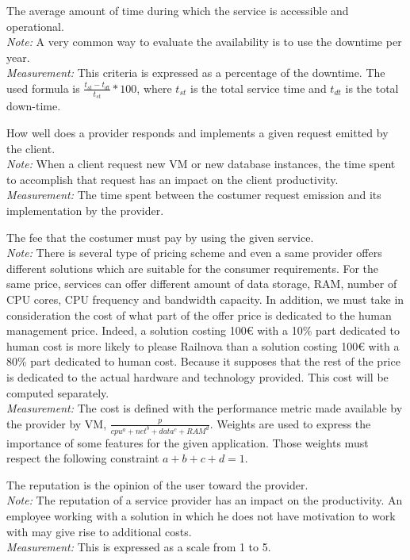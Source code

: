 \documentclass[a4paper,11pt]{article}
\begin{document}
\begin{description}[parsep=1pt,listparindent=\parindent,labelindent=\parindent,font=$\bullet$\ ]
  \item[Availability:] The average amount of time during which the service is accessible and operational.\\
    \emph{Note:} A very common way to evaluate the availability is to use the downtime per year.\\
    \emph{Measurement:} This criteria is expressed as a percentage of the downtime. The used formula is $\frac{t_{st}-t_{dt}}{t_{st}}*100$, where $t_{st}$ is the total service time and $t_{dt}$ is the total down-time.

  \item[Service efficiency:] How well does a provider responds and implements a given request emitted by the client.\\
    \emph{Note:} When a client request new VM or new database instances, the time spent to accomplish that request has an impact on the client productivity.\\
    \emph{Measurement:} The time spent between the costumer request emission and its implementation by the provider.

  \item[Cost:] The fee that the costumer must pay by using the given service.\\
    \emph{Note:} There is several type of pricing scheme and even a same provider offers different solutions which are suitable for the consumer requirements. For the same price, services can offer different amount of data storage, RAM, number of CPU cores, CPU frequency and bandwidth capacity. In addition, we must take in consideration the cost of what part of the offer price is dedicated to the human management price. Indeed, a solution costing 100\euro{} with a 10\% part dedicated to human cost is more likely to please Railnova than a solution costing 100\euro{} with a 80\% part dedicated to human cost. Because it supposes that the rest of the price is dedicated to the actual hardware and technology provided. This cost will be computed separately.\\
    \emph{Measurement:} The cost is defined with the performance metric made available by the provider by VM, $\frac{p}{cpu^a + net^b + data^c + RAM^d}$. Weights are used to express the importance of some features for the given application. Those weights must respect the following constraint $a+b+c+d=1$.

  \item[Reputation:] The reputation is the opinion of the user toward the provider.\\
    \emph{Note:} The reputation of a service provider has an impact on the productivity. An employee working with a solution in which he does not have motivation to work with may give rise to additional costs.\\
    \emph{Measurement:} This is expressed as a scale from 1 to 5.
    

\end{description}
\end{document}
